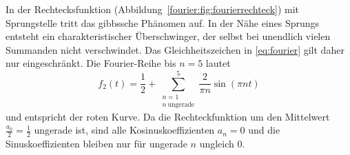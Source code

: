 \begin{beispiel}

In der Rechtecksfunktion (Abbildung~\ref{fourier:fig:fourierrechteck}) mit Sprungstelle tritt das gibbssche Phänomen auf.  
%
%
In der Nähe eines Sprungs entsteht ein charakteristischer Überschwinger, der selbst bei unendlich vielen Summanden nicht verschwindet.
Das Gleichheitszeichen in \eqref{eq:fourier} gilt daher nur eingeschränkt.  
Die Fourier-Reihe bis $n=5$ lautet
\begin{equation}
	f_2(t) = \frac{1}{2} + \sum_{\substack{n=1 \\ n\ \text{ungerade}}}^{5} \frac{2}{\pi n} \sin\left( \pi n t \right)
\end{equation}
und entspricht der roten Kurve.  
Da die Rechteckfunktion um den Mittelwert $\frac{a_0}{2}=\frac{1}{2}$ ungerade ist, sind alle Kosinuskoeffizienten $a_n=0$ und die Sinuskoeffizienten bleiben nur für ungerade $n$ ungleich $0$.  

\end{beispiel}






